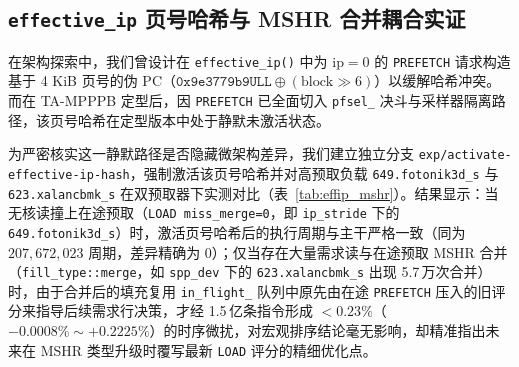 \documentclass[10.5pt,compsoc,UTF8]{CjC}
\begin{document}
\subsection{\texorpdfstring{\texttt{effective\_ip} 页号哈希与 MSHR 合并耦合实证}{effective\_ip 页号哈希与 MSHR 合并耦合实证}}

在架构探索中，我们曾设计在 \texttt{effective\_ip()} 中为 $\mathrm{ip}=0$ 的 \texttt{PREFETCH} 请求构造基于 4 KiB 页号的伪 PC（$\texttt{0x9e3779b9ULL}\oplus (\mathrm{block}\gg 6)$）以缓解哈希冲突。而在 TA-MPPPB 定型后，因 \texttt{PREFETCH} 已全面切入 \texttt{pfsel\_} 决斗与采样器隔离路径，该页号哈希在定型版本中处于静默未激活状态。

为严密核实这一静默路径是否隐藏微架构差异，我们建立独立分支 \texttt{exp/\allowbreak activate-\allowbreak effective-\allowbreak ip-\allowbreak hash}，强制激活该页号哈希并对高预取负载 \texttt{649.\allowbreak fotonik3d\_s} 与 \texttt{623.\allowbreak xalancbmk\_s} 在双预取器下实测对比（表~\ref{tab:effip_mshr}）。结果显示：当无核读撞上在途预取（\texttt{LOAD miss\_merge=0}，即 \texttt{ip\_stride} 下的 \texttt{649.\allowbreak fotonik3d\_s}）时，激活页号哈希后的执行周期与主干严格一致（同为 $207{,}672{,}023$ 周期，差异精确为 $0$）；仅当存在大量需求读与在途预取 MSHR 合并（\texttt{fill\_type::merge}，如 \texttt{spp\_dev} 下的 \texttt{623.\allowbreak xalancbmk\_s} 出现 5.7\,万次合并）时，由于合并后的填充复用 \texttt{in\_flight\_} 队列中原先由在途 \texttt{PREFETCH} 压入的旧评分来指导后续需求行决策，才经 1.5\,亿条指令形成 $<0.23\%$（$-0.0008\%\sim +0.2225\%$）的时序微扰，对宏观排序结论毫无影响，却精准指出未来在 MSHR 类型升级时覆写最新 \texttt{LOAD} 评分的精细优化点。

\begin{table}[t]
\centering
\caption{分支 \texttt{exp/activate-effective-ip-hash} 激活页号哈希实测与 MSHR 合并统计}
\label{tab:effip_mshr}
\end{table}
\end{document}
